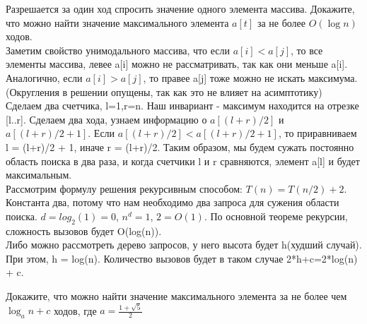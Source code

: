 \documentclass[12pt]{extreport}
\theoremstyle{definiton}
\theoremstyle{definition}
\theoremstyle{definition}
\newcounter{problem}
\newcounter{subproblem}
\def\PRSUBskip{
	\medskip
}
\def\prsub{\PRSUBskip\noindent\stepcounter{subproblem}{\sf \thesubproblem .} }
\def\prsubstar{\PRSUBskip\noindent\stepcounter{subproblem}{\rm $\thesubproblem^*$\negthickspace.  } }
\begin{document}
	\prsub Разрешается за один ход спросить значение одного элемента массива.
	Докажите, что можно найти значение максимального элемента $a[t]$ за
	не более $O(\log n)$ ходов.
	\newline
	\\ Заметим свойство унимодального массива, что если $a[i] < a[j]$, то все элементы массива, левее a[i] можно не рассматривать, так как они меньше a[i]. Аналогично, если $a[i] > a[j]$, то правее a[j] тоже можно не искать максимума. (Округления в решении опущены, так как это не влияет на асимптотику)
	\\ Сделаем два счетчика, l=1,r=n. Наш инвариант - максимум находится на отрезке [l..r]. Сделаем два хода, узнаем информацию о $a[(l+r)/2]$ и $a[(l+r)/2+1]$. Если $a[(l+r)/2] < a[(l+r)/2+1]$, то приравниваем l = (l+r)/2 + 1, иначе r = (l+r)/2. Таким образом, мы будем сужать постоянно область поиска в два раза, и когда счетчики l и r сравняются, элемент a[l] и будет максимальным.
	\\ Рассмотрим формулу решения рекурсивным способом: $T(n) = T(n/2) + 2$. Константа два, потому что нам необходимо два запроса для сужения области поиска. $d = log_2(1) = 0$, $n^d = 1$, $2 = O(1)$. По основной теореме рекурсии, сложность вызовов будет O(log(n)).
	\\ Либо можно рассмотреть дерево запросов, у него высота будет h(худший случай). При этом, h = log(n). Количество вызовов будет в таком случае 2*h+c=2*log(n) + c.
	

	\prsubstar Докажите, что можно найти значение максимального элемента за не более чем $\log_a n + c$ ходов, где $a=\frac{1+\sqrt{5}}{2}$
\end{document}
